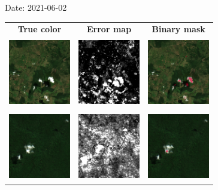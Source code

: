 \documentclass{beamer}
\begin{document}
\begin{frame}{Date: 2021-06-02}
    \begin{tabular}{ccc}
        \textbf{True color} & \textbf{Error map} & \textbf{Binary mask}\\
        \includegraphics[width=2.7cm,height=3cm]{Figures/v6/20210602/TCI_zoom5.png}& \includegraphics[width=2.7cm,height=3cm]{Figures/v6/20210602/error_map_zoom5.png} &\includegraphics[width=2.7cm,height=3cm]{Figures/v6/20210602/zoom5_BI.png}\\
        \includegraphics[width=2.7cm,height=3cm]{Figures/v6/20210602/TCI_zoom6.png}& \includegraphics[width=2.7cm,height=3cm]{Figures/v6/20210602/error_map_zoom6.png} &\includegraphics[width=2.7cm,height=3cm]{Figures/v6/20210602/zoom6_BI.png}\\
        \end{tabular}
\end{frame}
\end{document}
